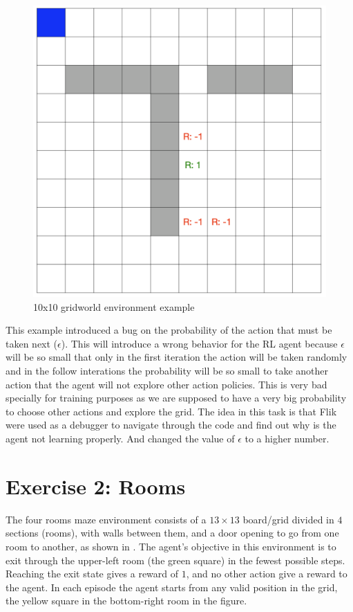 \begin{figure}[h]
  \centering
  \includegraphics[width=0.5\columnwidth]{figures/gridworld.png}
  \caption{10x10 gridworld environment example}
  \label{fig:gridworld}
\end{figure}

This example introduced a bug on the probability of the action that must be taken next ($\epsilon$). 
This will introduce a wrong behavior for the \ac{RL} 
agent because $\epsilon$ will be so small that only in the first iteration the action will be taken randomly 
and in the follow interations the probability will be so small to take another action that the agent will not explore
other action policies. This is very bad specially for training purposes as we are supposed to have a very big 
probability to choose other actions and explore the grid. The idea in this task is that Flik were used 
as a debugger to navigate through the code and find out why is the agent not learning properly. And changed 
the value of $\epsilon$ to a higher number. 

\section{Exercise 2: Rooms}
\label{sec:rooms-eval}

The four rooms maze environment consists of a $13\times 13$ board/grid divided in $4$ sections 
(\ie rooms), with walls between them, and a door opening to go from one room to another, as shown 
in . The agent's objective in this environment is to exit through the upper-left room 
(the green square) in the fewest possible steps. Reaching the exit state gives a reward of $1$, and no 
other action give a reward to the agent. In each episode the agent starts from any valid position in the 
grid, \eg the yellow square in the bottom-right room in the figure. 

